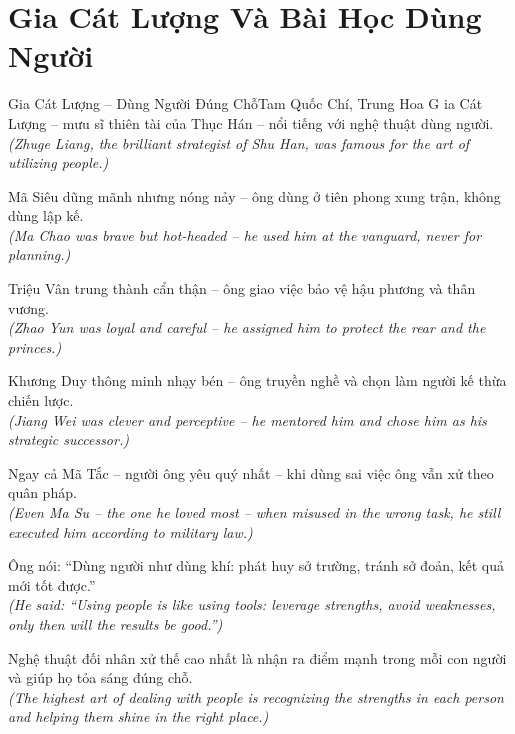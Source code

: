 \section{Gia Cát Lượng Và Bài Học Dùng Người}
\begin{truyen}{Gia Cát Lượng -- Dùng Người Đúng Chỗ}{Tam Quốc Chí, Trung Hoa}
G ia Cát Lượng -- mưu sĩ thiên tài của Thục Hán -- nổi tiếng với nghệ thuật dùng người.\\
\textit{(Zhuge Liang, the brilliant strategist of Shu Han, was famous for the art of utilizing people.)}

Mã Siêu dũng mãnh nhưng nóng nảy -- ông dùng ở tiên phong xung trận, không dùng lập kế.\\
\textit{(Ma Chao was brave but hot-headed -- he used him at the vanguard, never for planning.)}

Triệu Vân trung thành cẩn thận -- ông giao việc bảo vệ hậu phương và thân vương.\\
\textit{(Zhao Yun was loyal and careful -- he assigned him to protect the rear and the princes.)}

Khương Duy thông minh nhạy bén -- ông truyền nghề và chọn làm người kế thừa chiến lược.\\
\textit{(Jiang Wei was clever and perceptive -- he mentored him and chose him as his strategic successor.)}

Ngay cả Mã Tắc -- người ông yêu quý nhất -- khi dùng sai việc ông vẫn xử theo quân pháp.\\
\textit{(Even Ma Su -- the one he loved most -- when misused in the wrong task, he still executed him according to military law.)}

Ông nói: ``Dùng người như dùng khí: phát huy sở trường, tránh sở đoản, kết quả mới tốt được.''\\
\textit{(He said: ``Using people is like using tools: leverage strengths, avoid weaknesses, only then will the results be good.'')}

\end{truyen}
\begin{baihoc}
  Nghệ thuật đối nhân xử thế cao nhất là nhận ra điểm mạnh trong mỗi con người và giúp họ tỏa sáng đúng chỗ.\\
  \textit{(The highest art of dealing with people is recognizing the strengths in each person and helping them shine in the right place.)}
\end{baihoc}


